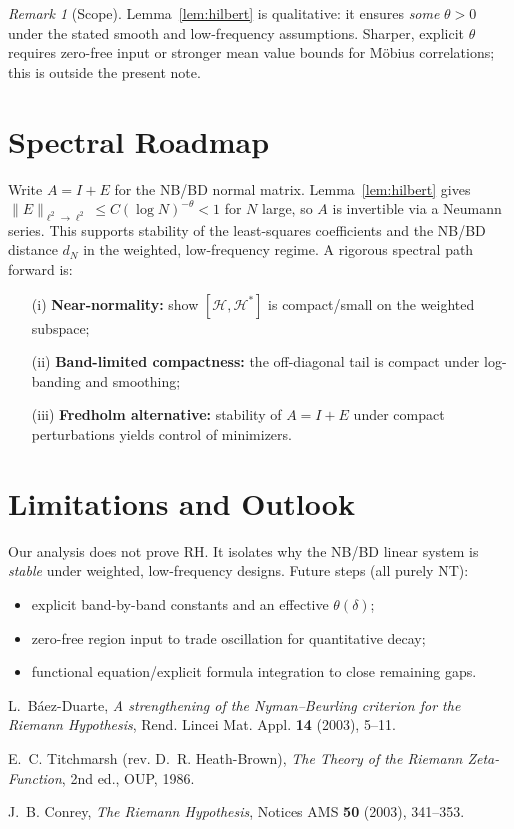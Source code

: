 \documentclass[11pt]{article}
\theoremstyle{remark}
\newtheorem{remark}{Remark}
\begin{document}
\begin{remark}[Scope]
Lemma~\ref{lem:hilbert} is qualitative: it ensures \emph{some} $\theta>0$ under the stated smooth and low-frequency assumptions.
Sharper, explicit $\theta$ requires zero-free input or stronger mean value bounds for M\"obius correlations; this is outside the present note.
\end{remark}

\section{Spectral Roadmap}
Write $A=I+E$ for the NB/BD normal matrix.
Lemma~\ref{lem:hilbert} gives $\|E\|_{\ell^2\to \ell^2}\le C(\log N)^{-\theta}<1$ for $N$ large, so $A$ is invertible via a Neumann series.
This supports stability of the least-squares coefficients and the NB/BD distance $d_N$ in the weighted, low-frequency regime.
A rigorous spectral path forward is:
\begin{itemize}
\item[(i)] \textbf{Near-normality:} show $[\mathcal{H},\mathcal{H}^\ast]$ is compact/small on the weighted subspace;
\item[(ii)] \textbf{Band-limited compactness:} the off-diagonal tail is compact under log-banding and smoothing;
\item[(iii)] \textbf{Fredholm alternative:} stability of $A=I+E$ under compact perturbations yields control of minimizers.
\end{itemize}

\section{Limitations and Outlook}
Our analysis does not prove RH. It isolates why the NB/BD linear system is \emph{stable} under weighted, low-frequency designs.
Future steps (all purely NT):
\begin{itemize}
\item explicit band-by-band constants and an effective $\theta(\delta)$;
\item zero-free region input to trade oscillation for quantitative decay;
\item functional equation/explicit formula integration to close remaining gaps.
\end{itemize}

\begin{thebibliography}{9}
L.~B\'aez-Duarte,
\emph{A strengthening of the Nyman--Beurling criterion for the Riemann Hypothesis},
Rend. Lincei Mat. Appl. \textbf{14} (2003), 5--11.

E.~C. Titchmarsh (rev. D.~R. Heath-Brown),
\emph{The Theory of the Riemann Zeta-Function}, 2nd ed., OUP, 1986.

J.~B. Conrey,
\emph{The Riemann Hypothesis},
Notices AMS \textbf{50} (2003), 341--353.
\end{thebibliography}
\end{document}

